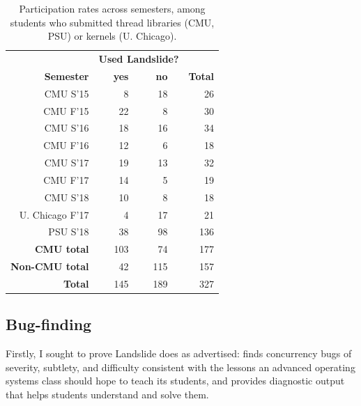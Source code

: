 \begin{table}[h]
	\begin{center}
		\begin{tabular}{r|crcrc|r}
			& \multicolumn{5}{c|}{\bf Used Landslide?} & \\
			\bf Semester & & \bf yes & & \bf no & & \bf Total \\
			\hline
			CMU S'15	& &   8	& &  18	& &  26 \\
			CMU F'15	& &  22	& &   8	& &  30 \\
			CMU S'16	& &  18	& &  16	& &  34 \\
			CMU F'16	& &  12	& &   6	& &  18 \\
			CMU S'17	& &  19	& &  13	& &  32 \\
			CMU F'17	& &  14	& &   5	& &  19 \\
			CMU S'18	& &  10	& &   8	& &  18 \\
			\hline
			U. Chicago F'17	& &   4	& &  17	& &  21 \\ %
			PSU S'18	& &  38	& &  98	& & 136 \\
			\hline
			\bf CMU total	& & 103	& &  74	& & 177 \\
			\bf Non-CMU total
					& &  42	& & 115	& & 157 \\
			\bf Total	& & 145	& & 189	& & 327 \\
		\end{tabular}
	\end{center}
	\caption[Participation rates across semesters.]
		{Participation rates across semesters,
	among students who submitted thread libraries (CMU, PSU) or kernels (U. Chicago).}
	\label{tab:photo-of-ze-studence}
\end{table}

\subsection{Bug-finding}
\label{sec:education-eval-bugfinding}

Firstly, I sought to prove Landslide does as advertised:
finds concurrency bugs of severity, subtlety, and difficulty
consistent with the lessons an advanced operating systems class should hope to teach its students,
and provides diagnostic output that helps students understand and solve them.

